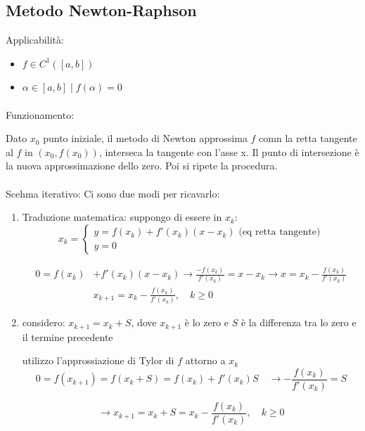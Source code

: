 \documentclass[a4paper, 11pt]{article}
\begin{document}
        \subsection{Metodo Newton-Raphson}
        Applicabilità:
        \begin{itemize}
            \item \( f \in C^1([a,b]) \)
            \item \( \alpha \in [a,b] \mid f(\alpha) = 0 \)
        \end{itemize}

        \paragraph{}
        Funzionamento:

        Dato $x_0$ punto iniziale, il metodo di Newton approssima $f$ comn la retta tangente al $f$ in $(x_0, f(x_0))$, interseca la tangente con l'asse x. Il punto di intersezione è la nuova approssimazione dello zero. Poi si ripete la procedura.

        \paragraph{}
        Scehma iterativo: 
        Ci sono due modi per ricavarlo:
    
        \begin{enumerate}
            \item Traduzione matematica:
            suppongo di essere in \( x_k \):
            \[
            x_k = 
            \begin{cases}
                y = f(x_k)+f'(x_k)(x-x_k) \text{ (eq retta tangente)}\\
                y = 0
            \end{cases}
            \]

            \[
            \begin{aligned}
                0 = f(x_k) &+ f'(x_k)(x-x_k) \rightarrow \frac{-f(x_k)}{f'(x_k)} = x-x_k \rightarrow x = x_k - \frac{f(x_k)}{f'(x_k)} \\
                &x_{k+1} = x_k -\frac{f(x_k)}{f'(x_k)}, \quad k \geq 0
            \end{aligned}
            \]

            \item considero: $x_{k+1} = x_k + S$, dove $x_{k+1}$ è lo zero e $S$ è la differenza tra lo zero e il termine precedente

            utilizzo l'approssiazione di Tylor di $f$ attorno a $x_k$
            \[
                0 = f(x_{k+1}) = f(x_k+S) = f(x_k) + f'(x_k) S \quad \rightarrow -\frac{f(x_k)}{f'(x_k)} = S
            \]

            \[
                \rightarrow x_{k+1} = x_k + S = x_k-\frac{f(x_k)}{f'(x_k)}, \quad k \geq 0
            \]
        \end{enumerate}
\end{document}
